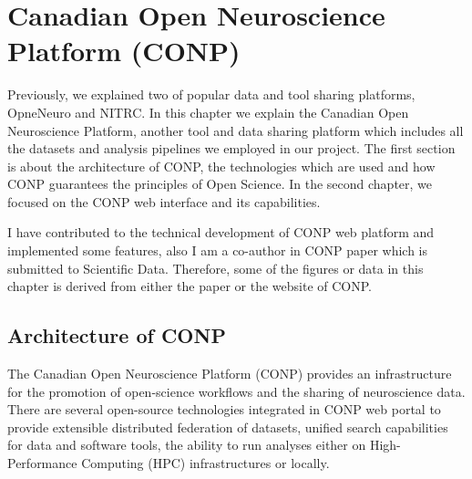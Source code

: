 \chapter{Canadian Open Neuroscience Platform (CONP)}

\label{CONP}

Previously, we explained two of popular data and tool sharing platforms, OpneNeuro and NITRC. In this chapter we explain the Canadian Open Neuroscience Platform, another tool and data sharing platform which includes all the datasets and analysis pipelines we employed in our project. The first section is about the architecture of CONP, the technologies which are used and how CONP guarantees the principles of Open Science. In the second chapter, we focused on the CONP web interface and its capabilities. 

I have contributed to the technical development of CONP web platform and implemented some features, also I am a co-author in CONP paper which is submitted to Scientific Data. Therefore, some of the figures or data in this chapter is derived from either the paper or the website of CONP.

\section{Architecture of CONP}
The Canadian Open Neuroscience Platform (CONP) provides an infrastructure for the promotion of open-science workflows and the sharing of neuroscience data. There are several open-source technologies integrated in CONP web portal to provide extensible distributed federation of datasets, unified search capabilities for data and software tools, the ability to run analyses either on High-Performance Computing (HPC) infrastructures or locally.


